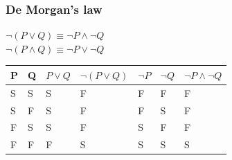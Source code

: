 \documentclass[12pt, a4paper]{article}
\begin{document}
				\subsubsection{De Morgan's law}
					$\neg(P\lor Q) \equiv \neg P \land \neg Q$\\
					$\neg(P\land Q) \equiv \neg P \lor \neg Q$\\
					\begin{table}[h!]
					\begin{tabular}{|l|l|l|l|l|l|l|}
					\hline
					P & Q & $P\lor Q$ & $\neg(P\lor Q)$ & $\neg P$ & $\neg Q$ & $\neg P \land \neg Q$ \\ \hline
					S & S & S                      & F                                           & F                     & F                     & F                                                                \\ \hline
					S & F & S                      & F                                           & F                     & S                     & F                                                                \\ \hline
					F & S & S                      & F                                           & S                     & F                     & F                                                                \\ \hline
					F & F & F                      & S                                           & S                     & S                     & S                                                                \\ \hline
					\end{tabular}
					\end{table}\\
\end{document}
